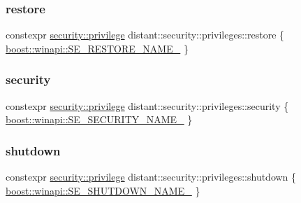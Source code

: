 \mbox{\label{namespacedistant_1_1security_1_1privileges_a1425c0bf5619f55d95d7b126d114dddf}} 
\subsubsection{\texorpdfstring{restore}{restore}}
{\footnotesize\ttfamily constexpr \mbox{\hyperlink{classdistant_1_1security_1_1privilege}{security\+::privilege}} distant\+::security\+::privileges\+::restore \{ \mbox{\hyperlink{namespaceboost_1_1winapi_a3839ae610aa2b16db98e14cfd1255bae}{boost\+::winapi\+::\+S\+E\+\_\+\+R\+E\+S\+T\+O\+R\+E\+\_\+\+N\+A\+M\+E\+\_\+}} \}}

\mbox{\label{namespacedistant_1_1security_1_1privileges_a7e2035a0926a28efbcf53ca8ade90d65}} 
\subsubsection{\texorpdfstring{security}{security}}
{\footnotesize\ttfamily constexpr \mbox{\hyperlink{classdistant_1_1security_1_1privilege}{security\+::privilege}} distant\+::security\+::privileges\+::security \{ \mbox{\hyperlink{namespaceboost_1_1winapi_a66576e5eeb9dfbd001e31860c79b6b4a}{boost\+::winapi\+::\+S\+E\+\_\+\+S\+E\+C\+U\+R\+I\+T\+Y\+\_\+\+N\+A\+M\+E\+\_\+}} \}}

\mbox{\label{namespacedistant_1_1security_1_1privileges_a26b2b2d7c747fd0792ed83d04c38cb68}} 
\subsubsection{\texorpdfstring{shutdown}{shutdown}}
{\footnotesize\ttfamily constexpr \mbox{\hyperlink{classdistant_1_1security_1_1privilege}{security\+::privilege}} distant\+::security\+::privileges\+::shutdown \{ \mbox{\hyperlink{namespaceboost_1_1winapi_aff9da0a1831bc20a284b22f39f42a70f}{boost\+::winapi\+::\+S\+E\+\_\+\+S\+H\+U\+T\+D\+O\+W\+N\+\_\+\+N\+A\+M\+E\+\_\+}} \}}

